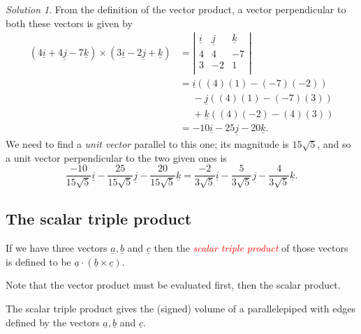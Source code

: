 \documentclass[
  11pt,
  oneside]{book}
\newcommand{\slide}{}
\theoremstyle{definition}
\theoremstyle{definition}
\theoremstyle{definition}
\theoremstyle{definition}
\theoremstyle{remark}
\newtheorem*{solution}{Solution}
\begin{document}
\begin{solution}
From the definition of the vector product, a vector perpendicular to both these vectors is given by
\begin{align*}
(4\underline i+4\underline j-7\underline k) \times(3\underline i - 2\underline j+\underline k)& = \left|\begin{array}{ccc}\underline i&\underline j&\underline k\\4&4&-7\\3&-2&1\\\end{array}\right|\\
&= \underline i((4)(1)-(-7)(-2))\\
&\phantom{= }-\underline j((4)(1)-(-7)(3))\\
&\phantom{= }+\underline k((4)(-2)-(4)(3))\\
&=-10\underline i-25\underline j-20\underline k.
\end{align*}
We need to find a \emph{unit vector} parallel to this one; its magnitude is \(15\sqrt{5}\), and so a unit vector perpendicular to the two given ones is
\[
\frac{-10}{15\sqrt{5}}\underline i-\frac{25}{15\sqrt{5}}\underline j-\frac{20}{15\sqrt{5}}\underline k = \frac{-2}{3\sqrt{5}}\underline i-\frac{5}{3\sqrt{5}}\underline j-\frac{4}{3\sqrt{5}}\underline k.
\]
\end{solution}

\begin{slidesonly}

\slide

\hbox{}
\slide

\end{slidesonly}

\subsection{The scalar triple product}\label{the-scalar-triple-product}

If we have three vectors \(\underline a, \underline b\) and \(\underline c\) then the \textcolor{red}{\em scalar triple product} of those vectors is defined to be \(\underline a \cdot(\underline b\times\underline c)\).

Note that the vector product must be evaluated first, then the scalar product.

The scalar triple product gives the (signed) volume of a parallelepiped with edges defined by the vectors \(\underline a, \underline b\) and \(\underline c\).
\end{document}
